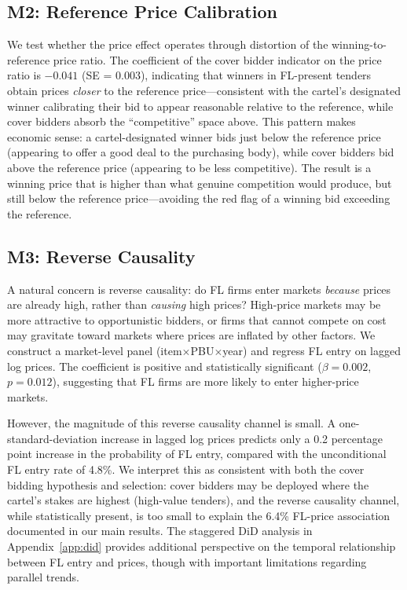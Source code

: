 \subsection{M2: Reference Price Calibration}

We test whether the price effect operates through distortion of the winning-to-reference price ratio. The coefficient of the cover bidder indicator on the price ratio is $-0.041$ (SE = 0.003), indicating that winners in FL-present tenders obtain prices \textit{closer} to the reference price---consistent with the cartel's designated winner calibrating their bid to appear reasonable relative to the reference, while cover bidders absorb the ``competitive'' space above. This pattern makes economic sense: a cartel-designated winner bids just below the reference price (appearing to offer a good deal to the purchasing body), while cover bidders bid above the reference price (appearing to be less competitive). The result is a winning price that is higher than what genuine competition would produce, but still below the reference price---avoiding the red flag of a winning bid exceeding the reference.

\subsection{M3: Reverse Causality}

A natural concern is reverse causality: do FL firms enter markets \textit{because} prices are already high, rather than \textit{causing} high prices? High-price markets may be more attractive to opportunistic bidders, or firms that cannot compete on cost may gravitate toward markets where prices are inflated by other factors. We construct a market-level panel (item$\times$PBU$\times$year) and regress FL entry on lagged log prices. The coefficient is positive and statistically significant ($\beta = 0.002$, $p = 0.012$), suggesting that FL firms are more likely to enter higher-price markets.

However, the magnitude of this reverse causality channel is small. A one-standard-deviation increase in lagged log prices predicts only a 0.2 percentage point increase in the probability of FL entry, compared with the unconditional FL entry rate of 4.8\%. We interpret this as consistent with both the cover bidding hypothesis and selection: cover bidders may be deployed where the cartel's stakes are highest (high-value tenders), and the reverse causality channel, while statistically present, is too small to explain the 6.4\% FL-price association documented in our main results. The staggered DiD analysis in Appendix~\ref{app:did} provides additional perspective on the temporal relationship between FL entry and prices, though with important limitations regarding parallel trends.


